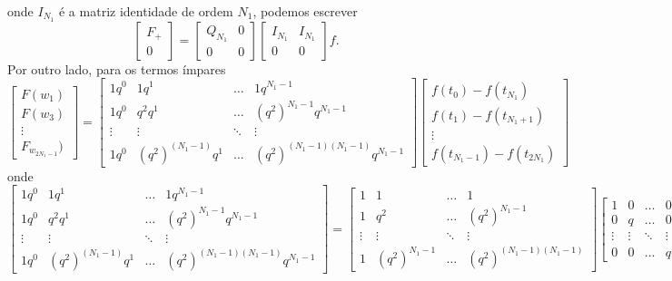 onde $I_{N_1}$ é a matriz identidade de ordem $N_1$, podemos escrever
\begin{dmath*}
  \begin{bmatrix}
    F_{+} \\
    0
    \end{bmatrix} = \begin{bmatrix}
    Q_{N_1} & 0 \\
    0 & 0
    \end{bmatrix} \begin{bmatrix}
    I_{N_1} & I_{N_1} \\
    0 & 0
  \end{bmatrix} f.
\end{dmath*}
Por outro lado, para os termos ímpares
\begin{dmath*}
  \begin{bmatrix}
    F(w_1) \\
    F(w_3) \\
    \vdots \\
    F_{w_{2 N_1 - 1}})
    \end{bmatrix} = \begin{bmatrix}
    1 q^0 & 1 q^1 & \ldots & 1 q^{N_1 - 1} \\
    1 q^0 & q^2 q^1 & \ldots & (q^2)^{N_1 - 1} q^{N_1 - 1} \\
    \vdots & \vdots & \ddots & \vdots \\
    1 q^0 & (q^2)^{(N_1 - 1)} q^1 & \ldots & (q^2)^{(N_1 - 1) (N_1 - 1)} q^{N_1 - 1}
    \end{bmatrix} \begin{bmatrix}
    f(t_0) - f(t_{N_1}) \\
    f(t_1) - f(t_{N_1 + 1}) \\
    \vdots \\
    f(t_{N_1 - 1}) - f(t_{2 N_1})
  \end{bmatrix}
\end{dmath*}
onde
\begin{dmath*}
    \begin{bmatrix}
    1 q^0 & 1 q^1 & \ldots & 1 q^{N_1 - 1} \\
    1 q^0 & q^2 q^1 & \ldots & (q^2)^{N_1 - 1} q^{N_1 - 1} \\
    \vdots & \vdots & \ddots & \vdots \\
    1 q^0 & (q^2)^{(N_1 - 1)} q^1 & \ldots & (q^2)^{(N_1 - 1) (N_1 - 1)} q^{N_1 - 1}
    \end{bmatrix} = \begin{bmatrix}
    1 & 1 & \ldots & 1 \\
    1 & q^2 & \ldots & (q^2)^{N_1 - 1} \\
    \vdots & \vdots & \ddots & \vdots \\
    1 & (q^2)^{N_1 - 1} & \ldots & (q^2)^{(N_1 - 1) (N_1 - 1)}
    \end{bmatrix} \begin{bmatrix}
    1 & 0 & \ldots & 0 \\
    0 & q & \ldots & 0 \\
    \vdots & \vdots & \ddots & \vdots \\
    0 & 0 & \ldots & q^{N_1 - 1}
  \end{bmatrix}
  = Q_{N_1} D_{N_1}.
\end{dmath*}
